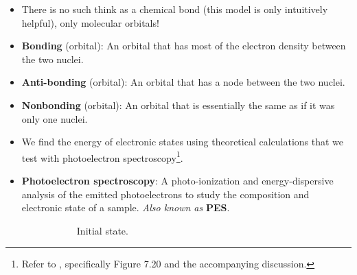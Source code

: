 \documentclass[../notes.tex]{subfiles}
\begin{document}
\begin{itemize}
    \item There is no such think as a chemical bond (this model is only intuitively helpful), only molecular orbitals!
    \item \textbf{Bonding} (orbital): An orbital that has most of the electron density between the two nuclei.
    \item \textbf{Anti-bonding} (orbital): An orbital that has a node between the two nuclei.
    \item \textbf{Nonbonding} (orbital): An orbital that is essentially the same as if it was only one nuclei.
    \item We find the energy of electronic states using theoretical calculations that we test with photoelectron spectroscopy\footnote{Refer to \textcite{bib:APChemNotes}, specifically Figure 7.20 and the accompanying discussion.}.
    \item \textbf{Photoelectron spectroscopy}: A photo-ionization and energy-dispersive analysis of the emitted photoelectrons to study the composition and electronic state of a sample. \emph{Also known as} \textbf{PES}.
    \begin{figure}[h!]
        \centering
        \begin{subfigure}[b]{0.45\linewidth}
            \centering
            \caption{Initial state.}
            \label{fig:PES-atomica}
        \end{subfigure}
        \begin{subfigure}[b]{0.45\linewidth}
            \centering
\end{subfigure}
\end{figure}
\end{itemize}
\end{document}
